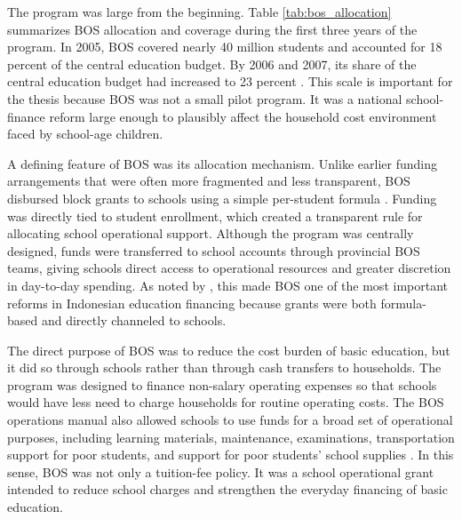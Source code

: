\documentclass[a4paper, 12pt]{article}
\begin{document}
\begin{doublespacing}
The program was large from the beginning. Table \ref{tab:bos_allocation} summarizes BOS allocation and coverage during the first three years of the program. In 2005, BOS covered nearly 40 million students and accounted for 18 percent of the central education budget. By 2006 and 2007, its share of the central education budget had increased to 23 percent \citep{WorldBank2008}. This scale is important for the thesis because BOS was not a small pilot program. It was a national school-finance reform large enough to plausibly affect the household cost environment faced by school-age children.



A defining feature of BOS was its allocation mechanism. Unlike earlier funding arrangements that were often more fragmented and less transparent, BOS disbursed block grants to schools using a simple per-student formula \citep{WorldBank2008}. Funding was directly tied to student enrollment, which created a transparent rule for allocating school operational support. Although the program was centrally designed, funds were transferred to school accounts through provincial BOS teams, giving schools direct access to operational resources and greater discretion in day-to-day spending. As noted by \citet{WorldBank2008}, this made BOS one of the most important reforms in Indonesian education financing because grants were both formula-based and directly channeled to schools.

The direct purpose of BOS was to reduce the cost burden of basic education, but it did so through schools rather than through cash transfers to households. The program was designed to finance non-salary operating expenses so that schools would have less need to charge households for routine operating costs. The BOS operations manual also allowed schools to use funds for a broad set of operational purposes, including learning materials, maintenance, examinations, transportation support for poor students, and support for poor students' school supplies \citep{WorldBank2008,UNESCOIIEPUNICEF2016}. In this sense, BOS was not only a tuition-fee policy. It was a school operational grant intended to reduce school charges and strengthen the everyday financing of basic education.


\end{doublespacing}
\end{document}
